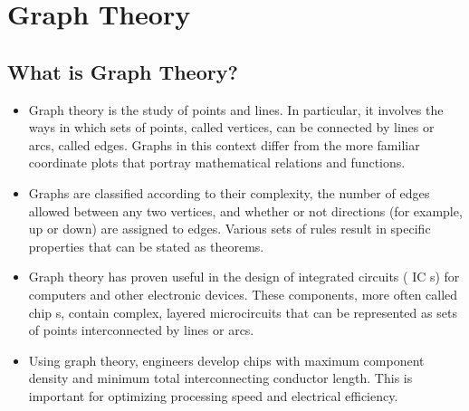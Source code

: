 \documentclass[a4paper,12pt]{article}
\begin{document}


\section*{Graph Theory}
\subsection*{What is Graph Theory?}
\begin{itemize}
\item Graph theory is the study of points and lines. In particular, it involves the ways in which sets of points, called vertices, can be connected by lines or arcs, called edges. Graphs in this context differ from the more familiar coordinate plots that portray mathematical relations and functions.

\item Graphs are classified according to their complexity, the number of edges allowed between any two vertices, and whether or not directions (for example, up or down) are assigned to edges. Various sets of rules result in specific properties that can be stated as theorems.

\item Graph theory has proven useful in the design of integrated circuits ( IC s) for computers and other electronic devices. These components, more often called chip s, contain complex, layered microcircuits that can be represented as sets of points interconnected by lines or arcs. 

\item Using graph theory, engineers develop chips with maximum component density and minimum total interconnecting conductor length. This is important for optimizing processing speed and electrical efficiency.
\end{itemize}
\end{document}
